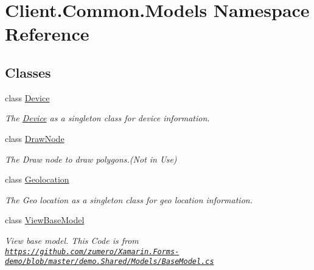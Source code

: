 \hypertarget{namespaceClient_1_1Common_1_1Models}{}\section{Client.\+Common.\+Models Namespace Reference}
\label{namespaceClient_1_1Common_1_1Models}
\subsection*{Classes}
\begin{DoxyCompactItemize}
\item 
class \hyperlink{classClient_1_1Common_1_1Models_1_1Device}{Device}
\begin{DoxyCompactList}\small\item\em The \hyperlink{classClient_1_1Common_1_1Models_1_1Device}{Device} as a singleton class for device information. \end{DoxyCompactList}\item 
class \hyperlink{classClient_1_1Common_1_1Models_1_1DrawNode}{Draw\+Node}
\begin{DoxyCompactList}\small\item\em The Draw node to draw polygons.(Not in Use) \end{DoxyCompactList}\item 
class \hyperlink{classClient_1_1Common_1_1Models_1_1Geolocation}{Geolocation}
\begin{DoxyCompactList}\small\item\em The Geo location as a singleton class for geo location information. \end{DoxyCompactList}\item 
class \hyperlink{classClient_1_1Common_1_1Models_1_1ViewBaseModel}{View\+Base\+Model}
\begin{DoxyCompactList}\small\item\em View base model. This Code is from \href{https://github.com/zumero/Xamarin.Forms-demo/blob/master/demo.Shared/Models/BaseModel.cs}{\tt https\+://github.\+com/zumero/\+Xamarin.\+Forms-\/demo/blob/master/demo.\+Shared/\+Models/\+Base\+Model.\+cs} \end{DoxyCompactList}\end{DoxyCompactItemize}
